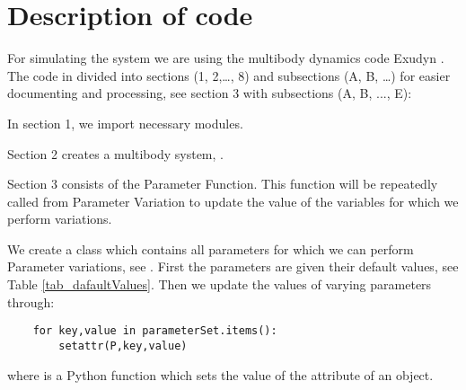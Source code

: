 \section{Description of code}
For simulating the system we are using the multibody dynamics code Exudyn \cite{Gerstmayr2022}.
%
The code in divided into sections (1, 2,…, 8) and subsections (A, B, …) for easier documenting and processing, see section 3 with subsections (A, B, ..., E):
\bi 
\item{In section 1, we import necessary modules.}
\item{Section 2 creates a multibody system, .}
\item{Section 3 consists of the Parameter Function. This function will be repeatedly called from Parameter Variation to update the value of the variables for which we perform variations.} 
\bi
\item{
We create a class  which contains all parameters for which we can perform Parameter variations, see . First the parameters are given their default values, see Table \ref{tab_dafaultValues}. Then we update the values of varying parameters through:
\pythonstyle
\begin{lstlisting}
	for key,value in parameterSet.items():
		setattr(P,key,value)
\end{lstlisting}		
where  is a Python function which sets the value of the attribute of an object.}
%
